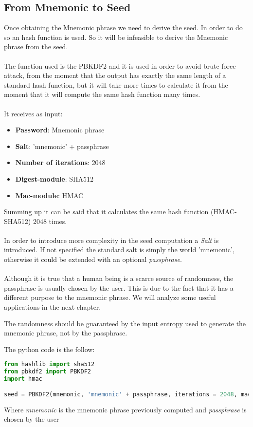 \subsection{From Mnemonic to Seed}
Once obtaining the Mnemonic phrase we need to derive the seed. In order to do so an hash function is used. So it will be infeasible to derive the Mnemonic phrase from the seed.
\\ \\
The function used is the PBKDF2 and it is used in order to avoid brute force attack, from the moment that the output has exactly the same length of a standard hash function, but it will take more times to calculate it from the moment that it will compute the same hash function many times.
\\ \\
It receives as input:
\begin{itemize}[label=$\odot$]
	\item \textbf{Password}: Mnemonic phrase
	\item \textbf{Salt}: 'mnemonic' + passphrase
	\item \textbf{Number of iterations}: 2048
	\item \textbf{Digest-module}: SHA512
	\item \textbf{Mac-module}: HMAC
\end{itemize}
Summing up it can be said that it calculates the same hash function (HMAC-SHA512) 2048 times.
\\ \\
In order to introduce more complexity in the seed computation a \textit{Salt} is introduced. If not specified the standard salt is simply the world 'mnemonic', otherwise it could be extended with an optional \textit{passphrase}.
\\ \\
Although it is true that a human being is a scarce source of randomness, the passphrase is usually chosen by the user. This is due to the fact that it has a different purpose to the mnemonic phrase. We will analyze some useful applications in the next chapter. 
\begin{remark}
	The randomness should be guaranteed by the input entropy used to generate the mnemonic phrase, not by the passphrase.
\end{remark}
The python code is the follow:
\begin{lstlisting}[language=Python]
from hashlib import sha512
from pbkdf2 import PBKDF2
import hmac

seed = PBKDF2(mnemonic, 'mnemonic' + passphrase, iterations = 2048, macmodule = hmac, digestmodule = sha512).read(64)
\end{lstlisting}
Where \textit{mnemonic} is the mnemonic phrase previously computed and \textit{passphrase} is chosen by the user

